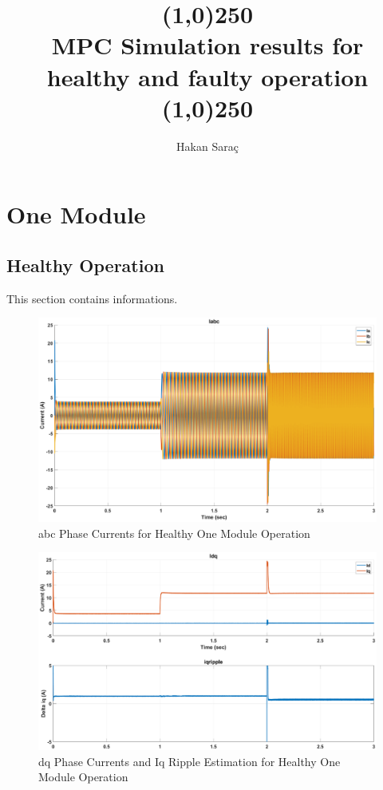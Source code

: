 \documentclass{article}
\author{\hisfont Hakan Saraç}
\date{}
\begin{document}
\title{\line(1,0){250}\\\myfont MPC Simulation results for healthy and faulty operation\\\line(1,0){250}}
\maketitle
\newpage
\tableofcontents
\newpage


\section{One Module}
\subsection{Healthy Operation}
This section contains informations.



\begin{figure}[h!]
\centering
\includegraphics[scale=0.35]{SimulationResults/one_module/Iabc.eps}
\caption{abc Phase Currents for Healthy One Module Operation}
\label{fig:PhaseCurrentsAbcOneModuleHealthy}
\end{figure}

\begin{figure}[h!]
\centering
\includegraphics[scale=0.35]{SimulationResults/one_module/Idq_iqripple.eps}
\caption{dq Phase Currents and Iq Ripple Estimation for Healthy One Module Operation}
\label{fig:PhaseCurrentsDqOneModuleHealthy}
\end{figure}
\end{document}

